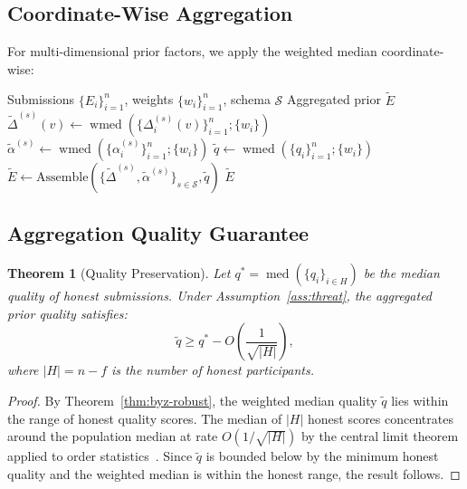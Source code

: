 \documentclass[11pt]{article}
\newtheorem{theorem}{Theorem}
\DeclareMathOperator{\med}{med}
\DeclareMathOperator{\wmed}{wmed}
\begin{document}
\subsection{Coordinate-Wise Aggregation}

For multi-dimensional prior factors, we apply the weighted median coordinate-wise:

\begin{algorithm}[H]
\caption{Byzantine-Robust Prior Aggregation}
\label{alg:aggregation}
\begin{algorithmic}[1]
\Require Submissions $\{E_i\}_{i=1}^n$, weights $\{w_i\}_{i=1}^n$, schema $\mathcal{S}$
\Ensure Aggregated prior $\tilde{E}$
        \State $\tilde{\Delta}^{(s)}(v) \gets \wmed(\{\Delta_i^{(s)}(v)\}_{i=1}^n; \{w_i\})$
    \EndFor
    \State $\tilde{\alpha}^{(s)} \gets \wmed(\{\alpha_i^{(s)}\}_{i=1}^n; \{w_i\})$
\EndFor
\State $\tilde{q} \gets \wmed(\{q_i\}_{i=1}^n; \{w_i\})$
\State $\tilde{E} \gets \text{Assemble}(\{\tilde{\Delta}^{(s)}, \tilde{\alpha}^{(s)}\}_{s \in \mathcal{S}}, \tilde{q})$
\State \Return $\tilde{E}$
\end{algorithmic}
\end{algorithm}

\subsection{Aggregation Quality Guarantee}

\begin{theorem}[Quality Preservation]
\label{thm:quality}
Let $q^* = \med(\{q_i\}_{i \in H})$ be the median quality of honest
submissions. Under Assumption~\ref{ass:threat}, the aggregated prior quality
satisfies:
\begin{equation}
    \tilde{q} \geq q^* - O\left(\frac{1}{\sqrt{|H|}}\right),
\end{equation}
where $|H| = n - f$ is the number of honest participants.
\end{theorem}

\begin{proof}
By Theorem~\ref{thm:byz-robust}, the weighted median quality $\tilde{q}$ lies
within the range of honest quality scores. The median of $|H|$ honest scores
concentrates around the population median at rate $O(1/\sqrt{|H|})$ by the
central limit theorem applied to order statistics~\cite{david2003order}. Since
$\tilde{q}$ is bounded below by the minimum honest quality and the weighted
median is within the honest range, the result follows.
\end{proof}
\end{document}

